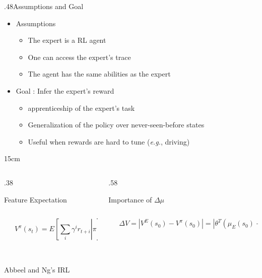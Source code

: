 \documentclass[xcolor=x11names,12pt]{beamer}
\newcommand{\TwoBoxes}[7]{%
  \begin{columns}
    \begin{column}{#1\textwidth}
      \begin{block}{#2}
        \begin{columns}
          \begin{column}{0.001\textwidth}
            \vspace{#7}
          \end{column}
          \begin{column}{\textwidth}
            \centering
            #3
          \end{column}
        \end{columns}       
      \end{block}
    \end{column}
    
    \begin{column}{#4\textwidth}
      \begin{block}{#5}
        \begin{columns}
          \begin{column}{0.001\textwidth}
            \vspace{#7}
          \end{column}
          \begin{column}{\textwidth}
            \centering
            #6
          \end{column}
        \end{columns}       
      \end{block}
    \end{column}
  \end{columns}
}
\begin{document}
\begin{frame}
{\begin{columns}
\begin{column}{.48\textwidth}
    \end{column}
  \end{columns}
}
{.48}{Assumptions and Goal}{
  \begin{itemize}
  \item Assumptions
    \begin{itemize}
    \item The expert is a RL agent
    \item One can access the expert's trace
    \item The agent has the same abilities as the expert
    \end{itemize}
  \item Goal : Infer the expert's reward
    \begin{itemize}
    \item apprenticeship of the expert's task
    \item Generalization of the policy over never-seen-before states
    \item Useful when rewards are hard to tune ({\it e.g.}, driving)
    \end{itemize}
  \end{itemize}
}
{15cm}
\vfill
\TwoBoxes{.38}{Feature Expectation}{
  \begin{equation*}
    V^\pi(s_t) = E\left[\left.\sum\limits_{i}\gamma^i r_{t+i}\right|\pi\right] = \theta^T\underbrace{E\left[\left.\sum\limits_{i}\gamma^i \phi(s_{t+i})\right|\pi\right]}_{\mu^\pi(s_t)}
  \end{equation*}
}{.58}{Importance of $\Delta \mu$}{
  \begin{equation*}
    \Delta V = |V^E(s_0) - V^\pi(s_0)| = |\theta^T\left(\mu_E(s_0) - \mu^\pi(s_0)\right)| \leq  ||\mu_E(s_0) - \mu^\pi(s_0)||_2 = \Delta\mu
  \end{equation*}
}
{6cm}
\vfill
  \begin{columns}
    \begin{column}{.48\textwidth}
    \begin{block}{Abbeel and Ng's IRL}
      \begin{columns}
        \begin{column}{0.001\textwidth}
          \vspace{8cm}
        \end{column}
        \begin{column}{\textwidth}
          \centering


\end{column}
\end{columns}
\end{block}
\end{column}
\end{columns}
\end{frame}
\end{document}
